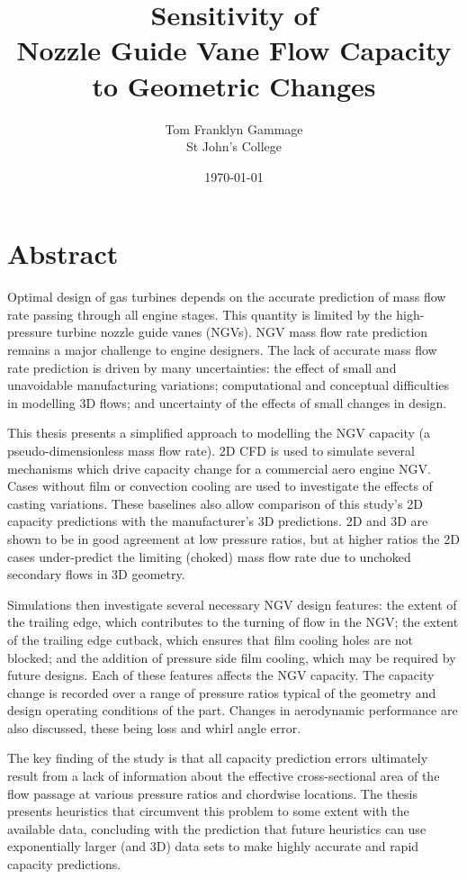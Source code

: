 \documentclass[a4paper, 11pt, oneside]{report}
\title{Sensitivity of\\Nozzle Guide Vane Flow Capacity\\to Geometric Changes}
\author{Tom Franklyn Gammage\\St John's College}
\date{\mydate\today}
\begin{document}
\maketitle



\chapter*{Abstract}


Optimal design of gas turbines depends on the accurate prediction of mass flow rate passing through all engine stages. This quantity is limited by the high-pressure turbine nozzle guide vanes (NGVs). NGV mass flow rate prediction remains a major challenge to engine designers. The lack of accurate mass flow rate prediction is driven by many uncertainties: the effect of small and unavoidable manufacturing variations; computational and conceptual difficulties in modelling 3D flows; and uncertainty of the effects of small changes in design. 

This thesis presents a simplified approach to modelling the NGV capacity (a pseudo-dimensionless mass flow rate). 2D CFD is used to simulate several mechanisms which drive capacity change for a commercial aero engine NGV. Cases without film or convection cooling are used to investigate the effects of casting variations. These baselines also allow comparison of this study's 2D capacity predictions with the manufacturer's 3D predictions. 2D and 3D are shown to be in good agreement at low pressure ratios, but at higher ratios the 2D cases under-predict the limiting (choked) mass flow rate due to unchoked secondary flows in 3D geometry.

Simulations then investigate several necessary NGV design features: the extent of the trailing edge, which contributes to the turning of flow in the NGV; the extent of the trailing edge cutback, which ensures that film cooling holes are not blocked; and the addition of pressure side film cooling, which may be required by future designs. Each of these features affects the NGV capacity. The capacity change is recorded over a range of pressure ratios typical of the geometry and design operating conditions of the part. Changes in aerodynamic performance are also discussed, these being loss and whirl angle error.

The key finding of the study is that all capacity prediction errors ultimately result from a lack of information about the effective cross-sectional area of the flow passage at various pressure ratios and chordwise locations. The thesis presents heuristics that circumvent this problem to some extent with the available data, concluding with the prediction that future heuristics can use exponentially larger (and 3D) data sets to make highly accurate and rapid capacity predictions.
\end{document}
